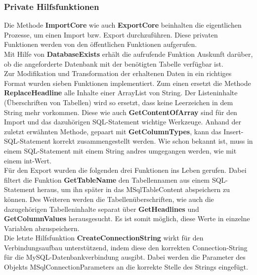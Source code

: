 \subsubsection{Private Hilfsfunktionen}
\label{mysqlHelper}
Die Methode \textbf{ImportCore} wie auch \textbf{ExportCore} beinhalten die eigentlichen Prozesse, um einen Import bzw. Export durchzuführen. Diese privaten Funktionen werden von den öffentlichen Funktionen aufgerufen.\\
Mit Hilfe von \textbf{DatabaseExists} erhält die aufrufende Funktion Auskunft darüber, ob die angeforderte Datenbank mit der benötigten Tabelle verfügbar ist.\\
Zur Modifikation und Transformation der erhaltenen Daten in ein richtiges Format wurden sieben Funktionen implementiert. Zum einen ersetzt die Methode \textbf{ReplaceHeadline} alle Inhalte einer ArrayList von String. Der Listeninhalte (Überschriften von Tabellen) wird so ersetzt, dass keine Leerzeichen in dem String mehr vorkommen. Diese wie auch \textbf{GetContentOfArray} sind für den Import und das dazuhörigen SQL-Statement wichtige Werkzeuge. Anhand der zuletzt erwähnten Methode, gepaart mit \textbf{GetColumnTypes}, kann das Insert-SQL-Statement korrekt zusammengestellt werden. Wie schon bekannt ist, muss in einem SQL-Statement mit einem String andres umgegangen werden, wie mit einem int-Wert.\\
Für den Export wurden die folgenden drei Funktionen ins Leben gerufen. Dabei filtert die Funktion \textbf{GetTableName} den Tabellennamen aus einem SQL-Statement heraus, um ihn später in das MSqlTableContent abspeichern zu können. Des Weiteren werden die Tabellenüberschriften, wie auch die dazugehörigen Tabelleninhalte separat über \textbf{GetHeadlines} und \textbf{GetColumnValues} herausgesucht. Es ist somit möglich, diese Werte in einzelne Variablen abzuspeichern.\\
Die letzte Hilfsfunktion \textbf{CreateConnectionString} wirkt für den Verbindungsaufbau unterstützend, indem diese den korrekten Connection-String für die MySQL-Datenbankverbindung ausgibt. Dabei werden die Parameter des Objekts MSqlConnectionParameters an die korrekte Stelle des Strings eingefügt.
\newpage

